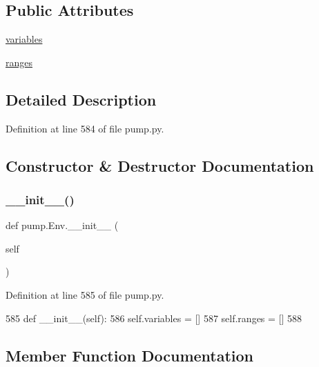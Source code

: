 \subsection*{Public Attributes}
\begin{DoxyCompactItemize}
\item 
\hyperlink{classpump_1_1Env_aba6456f3d0d23ac92bc9508c1b966bcd}{variables}
\item 
\hyperlink{classpump_1_1Env_a8d5fec087c1a9108de9b105922b34309}{ranges}
\end{DoxyCompactItemize}


\subsection{Detailed Description}


Definition at line 584 of file pump.\+py.



\subsection{Constructor \& Destructor Documentation}
\mbox{\label{classpump_1_1Env_a803732618a49ab4a2edf098b78081611}} 
\subsubsection{\texorpdfstring{\+\_\+\+\_\+init\+\_\+\+\_\+()}{\_\_init\_\_()}}
{\footnotesize\ttfamily def pump.\+Env.\+\_\+\+\_\+init\+\_\+\+\_\+ (\begin{DoxyParamCaption}\item[{}]{self }\end{DoxyParamCaption})}



Definition at line 585 of file pump.\+py.


\begin{DoxyCode}
585   \textcolor{keyword}{def }\_\_init\_\_(self):
586     self.variables = []
587     self.ranges = []
588 
\end{DoxyCode}


\subsection{Member Function Documentation}
\mbox{\label{classpump_1_1Env_a4c1b156cfa4aec708746bbe07dae5f1a}} 
